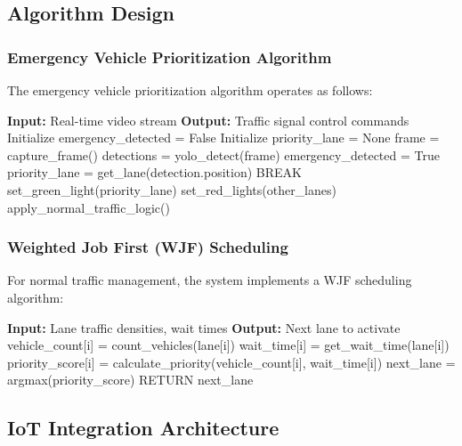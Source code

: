 \subsection{Algorithm Design}

\subsubsection{Emergency Vehicle Prioritization Algorithm}

The emergency vehicle prioritization algorithm operates as follows:

\begin{algorithmic}[1]
\STATE \textbf{Input:} Real-time video stream
\STATE \textbf{Output:} Traffic signal control commands
\STATE 
\STATE Initialize emergency\_detected = False
\STATE Initialize priority\_lane = None
\STATE 
{}
    \STATE frame = capture\_frame()
    \STATE detections = yolo\_detect(frame)
    \STATE 
            \STATE emergency\_detected = True
            \STATE priority\_lane = get\_lane(detection.position)
            \STATE BREAK
        \ENDIF
    \ENDFOR
    \STATE 
        \STATE set\_green\_light(priority\_lane)
        \STATE set\_red\_lights(other\_lanes)
    \ELSE
        \STATE apply\_normal\_traffic\_logic()
    \ENDIF
\ENDWHILE
\end{algorithmic}

\subsubsection{Weighted Job First (WJF) Scheduling}

For normal traffic management, the system implements a WJF scheduling algorithm:

\begin{algorithmic}[1]
\STATE \textbf{Input:} Lane traffic densities, wait times
\STATE \textbf{Output:} Next lane to activate
\STATE 
{}
    \STATE vehicle\_count[i] = count\_vehicles(lane[i])
    \STATE wait\_time[i] = get\_wait\_time(lane[i])
    \STATE priority\_score[i] = calculate\_priority(vehicle\_count[i], wait\_time[i])
\ENDFOR
\STATE 
\STATE next\_lane = argmax(priority\_score)
\STATE RETURN next\_lane
\end{algorithmic}

\subsection{IoT Integration Architecture}

